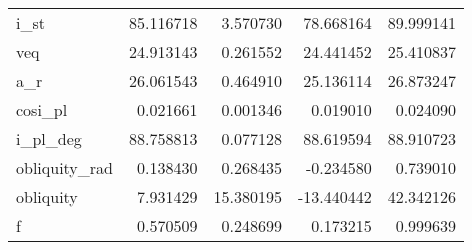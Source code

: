 \begin{tabular}{lrrrr}
i\_st          &  85.116718 &   3.570730 &  78.668164 &   89.999141 \\
veq           &  24.913143 &   0.261552 &  24.441452 &   25.410837 \\
a\_r           &  26.061543 &   0.464910 &  25.136114 &   26.873247 \\
cosi\_pl       &   0.021661 &   0.001346 &   0.019010 &    0.024090 \\
i\_pl\_deg      &  88.758813 &   0.077128 &  88.619594 &   88.910723 \\
obliquity\_rad &   0.138430 &   0.268435 &  -0.234580 &    0.739010 \\
obliquity     &   7.931429 &  15.380195 & -13.440442 &   42.342126 \\
f             &   0.570509 &   0.248699 &   0.173215 &    0.999639 \\
\bottomrule
\end{tabular}

